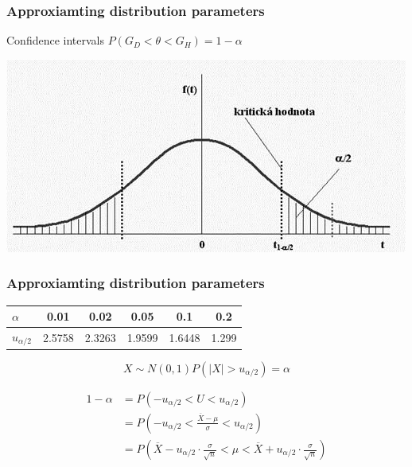\documentclass{beamer}
\begin{document}
\begin{frame}
\frametitle{Approxiamting distribution parameters}

\begin{block}{Confidence intervals}
$P (G_D < \theta < G_H) = 1 - \alpha$
\end{block}

\includegraphics[width=\textwidth]{df4.png}
\end{frame}


\begin{frame}
\frametitle{Approxiamting distribution parameters}

\begin{table}[t]
\begin{tabular}{|l|c|c|c|c|c|}
\hline
$\alpha$     & 0.01   & 0.02   & 0.05   & 0.1    & 0.2   \\ \hline
$u_{\alpha/2}$ & 2.5758 & 2.3263 & 1.9599 & 1.6448 & 1.299 \\ \hline
\end{tabular}
\end{table}
\begin{equation*}
X \sim N(0,1) P(|X| > u_{\alpha/2}) = \alpha
\end{equation*}

\begin{align*}
1 - \alpha &= P(-u_{\alpha/2} < U < u_{\alpha/2}) \\
               &= P(-u_{\alpha/2} < \frac{\overline{X}-\mu}{\sigma} < u_{\alpha/2}) \\
               &= P(\overline{X} - u_{\alpha/2} \cdot \frac{\sigma}{\sqrt{n}} < \mu < \overline{X} + u_{\alpha/2} \cdot \frac{\sigma}{\sqrt{n}})
\end{align*}

\end{frame}
\end{document}
